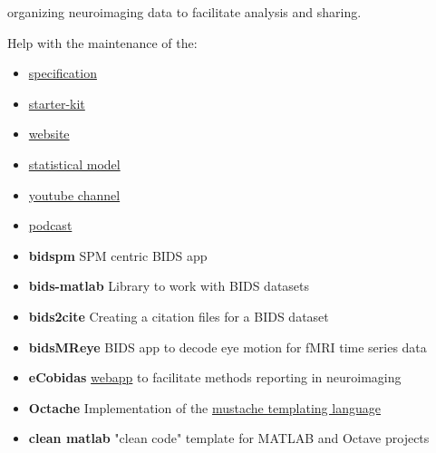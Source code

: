 
 organizing neuroimaging data to facilitate analysis and sharing.

Help with the maintenance of the:
\begin{itemize}
    \item \href{https://bids-specification.readthedocs.io/en/latest/}{specification}
    \item \href{https://bids-standard.github.io/bids-starter-kit/}{starter-kit}
    \item \href{https://bids.neuroimaging.io/}{website}
    \item \href{https://bids-standard.github.io/stats-models/}{statistical model}
    \item \href{https://www.youtube.com/channel/UCxZUcYfd_nvIVWAbzRB1tlw}{youtube channel}
    \item \href{https://anchor.fm/bids-maintenance}{podcast}
\end{itemize}

\vspace{5mm}



\begin{itemize}
    \item \textbf{bidspm} \matlabicon \octaveicon SPM centric BIDS app
    \item \textbf{bids-matlab} \matlabicon \octaveicon Library to work with BIDS datasets
    \item \textbf{bids2cite} \pythonicon Creating a citation files for a BIDS dataset
    \item \textbf{bidsMReye} \pythonicon BIDS app to decode eye motion for fMRI time series data
    \item \textbf{eCobidas} \pythonicon \vueicon \href{https://ohbm.github.io/cobidas/}{webapp}
    to facilitate methods reporting in neuroimaging
    \item \textbf{Octache} \matlabicon \octaveicon
    Implementation of the \href{https://mustache.github.io/}{mustache templating language}
    \item \textbf{clean matlab} \matlabicon \octaveicon "clean code" template for MATLAB and Octave projects
\end{itemize}




